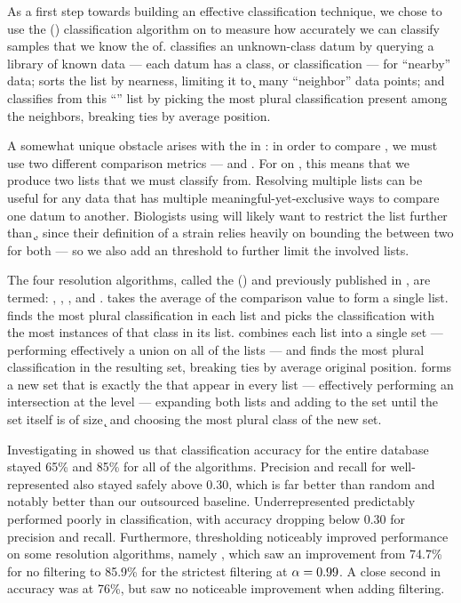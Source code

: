 

As a first step towards building an effective classification technique, we chose to use the \kNNlong{} (\kNN) classification algorithm on \cplop{} to measure how accurately we can classify samples that we know the \spec{} of.
\kNN{} classifies an unknown-class datum by querying a library of known data --- each datum has a class, or classification --- for ``nearby'' data; sorts the list by nearness, limiting it to \k{} many ``neighbor'' data points; and classifies from this ``\knnlong{}'' list by picking the most plural classification present among the neighbors, breaking ties by average position.

A somewhat unique obstacle arises with the \ecoli{} \isols{} in \cplop{}: in order to compare \isols{}, we must use two different comparison metrics --- \pcsixt{} and \pcfive{}.
For \kNN{} on \cplop{} \ecoli{} \isols{}, this means that we produce two \knnlong{} lists that we must classify from.
Resolving multiple \kNN{} lists can be useful for any data that has multiple meaningful-yet-exclusive ways to compare one datum to another.
Biologists using \kNN{} will likely want to restrict the list further than \k{}, since their definition of a strain relies heavily on bounding the \pearson{} between two \isols{} for both \itsshort{} --- so we also add an \a{} threshold to further limit the involved \kNN{} lists.

The four resolution algorithms, called the \krapmed{} (\krap{}) and previously published in \cite{DBLP:conf/bibm/McGovernDKBVG15}, are termed: \rmean{}, \rwinner{}, \runion{}, and \rintersect{}.
\rmean{} takes the average of the comparison value to form a single \kNN{} list.
\rwinner{} finds the most plural classification in each \kNN{} list and picks the classification with the most instances of that class in its list.
\runion{} combines each \kNN{} list into a single set --- performing effectively a union on all of the \kNN{} lists --- and finds the most plural classification in the resulting set, breaking ties by average original position.
\rintersect{} forms a new set that is exactly the \isols{} that appear in every \kNN{} list --- effectively performing an intersection at the \isol{} level --- expanding both lists and adding to the set until the set itself is of size \k{} and choosing the most plural class of the new set.

Investigating \krap{} in \cite{DBLP:conf/bibm/McGovernDKBVG15} showed us that classification accuracy for the entire database stayed 65\% and 85\% for all of the algorithms.
Precision and recall for well-represented \spec{} also stayed safely above 0.30, which is far better than random and notably better than our outsourced baseline.
Underrepresented \spec{} predictably performed poorly in classification, with \krap{} accuracy dropping below 0.30 for precision and recall.
Furthermore, \a{} thresholding noticeably improved performance on some resolution algorithms, namely \rintersect{}, which saw an improvement from 74.7\% for no filtering to 85.9\% for the strictest filtering at $\alpha{} = 0.99$.
A close second in accuracy was \runion{} at 76\%, but saw no noticeable improvement when adding \a{} filtering.


